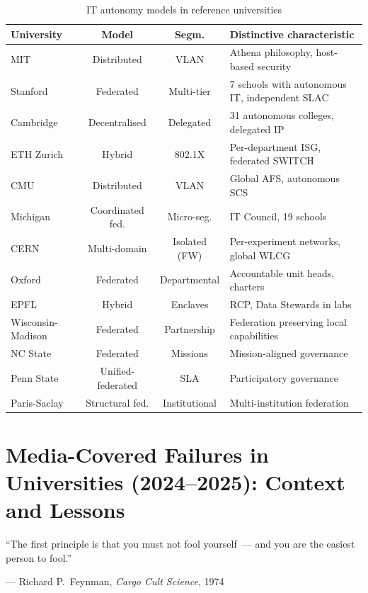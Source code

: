 \begin{table}[H]
\centering
\caption{IT autonomy models in reference universities}
\label{tab:comparatif}
\small
\begin{tabularx}{\textwidth}{l c c X}
\toprule
\textbf{University} & \textbf{Model} & \textbf{Segm.} &
    \textbf{Distinctive characteristic} \\
\midrule
MIT & Distributed & VLAN & Athena philosophy, host-based security \\
Stanford & Federated & Multi-tier & 7 schools with autonomous IT, independent SLAC \\
Cambridge & Decentralised & Delegated & 31 autonomous colleges, delegated IP \\
ETH Zurich & Hybrid & 802.1X & Per-department ISG, federated SWITCH \\
CMU & Distributed & VLAN & Global AFS, autonomous SCS \\
Michigan & Coordinated fed. & Micro-seg. & IT Council, 19 schools \\
CERN & Multi-domain & Isolated (FW) & Per-experiment networks, global WLCG \\
Oxford & Federated & Departmental & Accountable unit heads, charters \\
EPFL & Hybrid & Enclaves & RCP, Data Stewards in labs \\
Wisconsin-Madison & Federated & Partnership & Federation preserving local capabilities \\
NC State & Federated & Missions & Mission-aligned governance \\
Penn State & Unified-federated & SLA & Participatory governance \\
Paris-Saclay & Structural fed. & Institutional & Multi-institution federation \\
\bottomrule
\end{tabularx}
\end{table}

\section{Media-Covered Failures in Universities (2024--2025): Context and Lessons}
\label{sec:defaillances-mediatiques}

\epigraph{``The first principle is that you must not fool yourself~--- and you are the easiest person to fool.''}{--- Richard P.\ Feynman, \textit{Cargo Cult Science}, 1974~\cite{feynman1974}}

